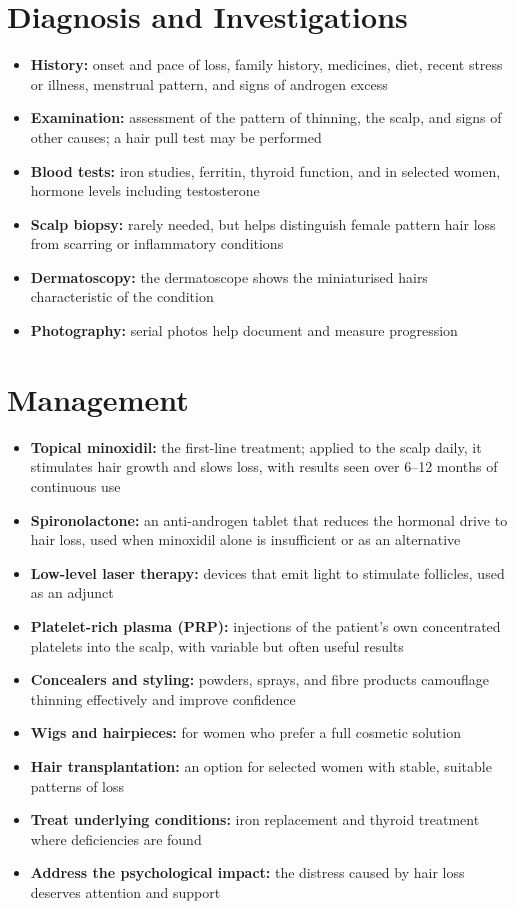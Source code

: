\section*{Diagnosis and Investigations}
\begin{itemize}
    \item \textbf{History:} onset and pace of loss, family history, medicines, diet, recent stress or illness, menstrual pattern, and signs of androgen excess
    \item \textbf{Examination:} assessment of the pattern of thinning, the scalp, and signs of other causes; a hair pull test may be performed
    \item \textbf{Blood tests:} iron studies, ferritin, thyroid function, and in selected women, hormone levels including testosterone
    \item \textbf{Scalp biopsy:} rarely needed, but helps distinguish female pattern hair loss from scarring or inflammatory conditions
    \item \textbf{Dermatoscopy:} the dermatoscope shows the miniaturised hairs characteristic of the condition
    \item \textbf{Photography:} serial photos help document and measure progression
\end{itemize}

\section*{Management}
\begin{itemize}
    \item \textbf{Topical minoxidil:} the first-line treatment; applied to the scalp daily, it stimulates hair growth and slows loss, with results seen over 6--12 months of continuous use
    \item \textbf{Spironolactone:} an anti-androgen tablet that reduces the hormonal drive to hair loss, used when minoxidil alone is insufficient or as an alternative
    \item \textbf{Low-level laser therapy:} devices that emit light to stimulate follicles, used as an adjunct
    \item \textbf{Platelet-rich plasma (PRP):} injections of the patient's own concentrated platelets into the scalp, with variable but often useful results
    \item \textbf{Concealers and styling:} powders, sprays, and fibre products camouflage thinning effectively and improve confidence
    \item \textbf{Wigs and hairpieces:} for women who prefer a full cosmetic solution
    \item \textbf{Hair transplantation:} an option for selected women with stable, suitable patterns of loss
    \item \textbf{Treat underlying conditions:} iron replacement and thyroid treatment where deficiencies are found
    \item \textbf{Address the psychological impact:} the distress caused by hair loss deserves attention and support
\end{itemize}

